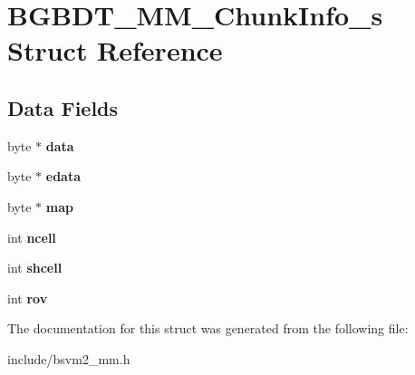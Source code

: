 \hypertarget{structBGBDT__MM__ChunkInfo__s}{\section{B\-G\-B\-D\-T\-\_\-\-M\-M\-\_\-\-Chunk\-Info\-\_\-s Struct Reference}
\label{structBGBDT__MM__ChunkInfo__s}
}
\subsection*{Data Fields}
\begin{DoxyCompactItemize}
\item 
\hypertarget{structBGBDT__MM__ChunkInfo__s_a2e6c174b0ec03642821c31c20adc5f82}{byte $\ast$ {\bfseries data}}\label{structBGBDT__MM__ChunkInfo__s_a2e6c174b0ec03642821c31c20adc5f82}

\item 
\hypertarget{structBGBDT__MM__ChunkInfo__s_ab15c2ddc50991be6ad8fa12ac628b2f2}{byte $\ast$ {\bfseries edata}}\label{structBGBDT__MM__ChunkInfo__s_ab15c2ddc50991be6ad8fa12ac628b2f2}

\item 
\hypertarget{structBGBDT__MM__ChunkInfo__s_ae7e1be7d959cc276d26d2e65974c3aa4}{byte $\ast$ {\bfseries map}}\label{structBGBDT__MM__ChunkInfo__s_ae7e1be7d959cc276d26d2e65974c3aa4}

\item 
\hypertarget{structBGBDT__MM__ChunkInfo__s_ab03bfa9229ad21e000a68c70ab5c77d2}{int {\bfseries ncell}}\label{structBGBDT__MM__ChunkInfo__s_ab03bfa9229ad21e000a68c70ab5c77d2}

\item 
\hypertarget{structBGBDT__MM__ChunkInfo__s_a36e89e72c1b026df22a106381d8a5559}{int {\bfseries shcell}}\label{structBGBDT__MM__ChunkInfo__s_a36e89e72c1b026df22a106381d8a5559}

\item 
\hypertarget{structBGBDT__MM__ChunkInfo__s_a360c381e6e8c004c366a7c7a73329558}{int {\bfseries rov}}\label{structBGBDT__MM__ChunkInfo__s_a360c381e6e8c004c366a7c7a73329558}

\end{DoxyCompactItemize}


The documentation for this struct was generated from the following file\-:\begin{DoxyCompactItemize}
\item 
include/bsvm2\-\_\-mm.\-h\end{DoxyCompactItemize}
